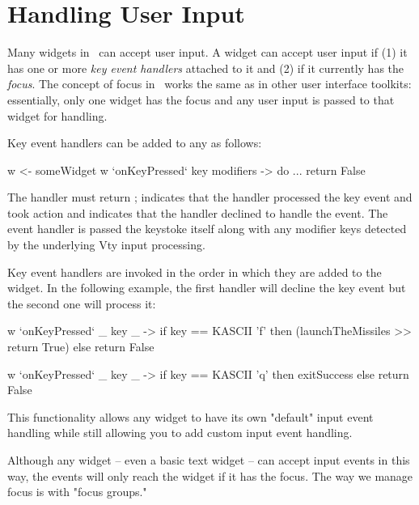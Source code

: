 \section{Handling User Input}

Many widgets in \vtyui\ can accept user input.  A widget can accept
user input if (1) it has one or more \textit{key event handlers}
attached to it and (2) if it currently has the \textit{focus}.  The
concept of focus in \vtyui\ works the same as in other user interface
toolkits: essentially, only one widget has the focus and any user
input is passed to that widget for handling.

Key event handlers can be added to any  as follows:

\begin{haskellcode}
 w <- someWidget
 w `onKeyPressed` \this key modifiers -> do
   ...
   return False
\end{haskellcode}

The handler must return ;  indicates that the
handler processed the key event and took action and 
indicates that the handler declined to handle the event.  The event
handler is passed the keystoke itself along with any modifier keys
detected by the underlying Vty input processing.

Key event handlers are invoked in the order in which they are added to
the widget.  In the following example, the first handler will decline
the  key event but the second one will process it:

\begin{haskellcode}
 w `onKeyPressed` \_ key _ ->
   if key == KASCII 'f' then
     (launchTheMissiles >> return True) else
     return False

 w `onKeyPressed` \_ key _ ->
   if key == KASCII 'q' then
     exitSuccess else return False
\end{haskellcode}

This functionality allows any widget to have its own "default" input
event handling while still allowing you to add custom input event
handling.

Although any widget -- even a basic text widget -- can accept input
events in this way, the events will only reach the widget if it has the
focus.  The way we manage focus is with "focus groups."
